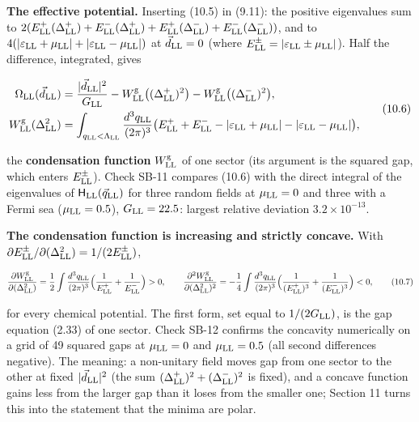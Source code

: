 \documentclass[
  10pt,
]{article}
\begin{document}
\textbf{The effective potential.} Inserting (10.5) in (9.11): the
positive eigenvalues sum to
\(2(E^+_{\rm LL}(\Delta^+_{\rm LL})+E^-_{\rm LL}(\Delta^+_{\rm LL})+E^+_{\rm LL}(\Delta^-_{\rm LL})+E^-_{\rm LL}(\Delta^-_{\rm LL}))\),
and to
\(4(\lvert\varepsilon_{\rm LL}+\mu_{\rm LL}\rvert+\lvert\varepsilon_{\rm LL}-\mu_{\rm LL}\rvert)\)
at \(\vec d_{\rm LL}=0\) (where
\(E^\pm_{\rm LL}=\lvert\varepsilon_{\rm LL}\pm\mu_{\rm LL}\rvert\)).
Half the difference, integrated, gives

\[\begin{aligned}\Omega_{\rm LL}(\vec d_{\rm LL})&=\frac{\lvert\vec d_{\rm LL}\rvert^2}{G_{\rm LL}}-W^{\rm g}_{\rm LL}\big((\Delta^+_{\rm LL})^2\big)-W^{\rm g}_{\rm LL}\big((\Delta^-_{\rm LL})^2\big),\\W^{\rm g}_{\rm LL}(\Delta_{\rm LL}^2)&=\int_{q_{\rm LL}<\Lambda_{\rm LL}}\frac{d^3q_{\rm LL}}{(2\pi)^3}\big(E^+_{\rm LL}+E^-_{\rm LL}-\lvert\varepsilon_{\rm LL}+\mu_{\rm LL}\rvert-\lvert\varepsilon_{\rm LL}-\mu_{\rm LL}\rvert\big),\end{aligned}\tag{10.6}\]

the \textbf{condensation function} \(W^{\rm g}_{\rm LL}\) of one sector
(its argument is the squared gap, which enters \(E^\pm_{\rm LL}\)).
Check SB-11 compares (10.6) with the direct integral of the eigenvalues
of \(\mathsf H_{\rm LL}(\vec q_{\rm LL})\) for three random fields at
\(\mu_{\rm LL}=0\) and three with a Fermi sea (\(\mu_{\rm LL}=0.5\)),
\(G_{\rm LL}=22.5\): largest relative deviation \(3.2\times10^{-13}\).

\textbf{The condensation function is increasing and strictly concave.}
With
\(\partial E^\pm_{\rm LL}/\partial(\Delta_{\rm LL}^2)=1/(2E^\pm_{\rm LL})\),

\[\frac{\partial W^{\rm g}_{\rm LL}}{\partial(\Delta_{\rm LL}^2)}=\frac12\int\frac{d^3q_{\rm LL}}{(2\pi)^3}\Big(\frac1{E^+_{\rm LL}}+\frac1{E^-_{\rm LL}}\Big)>0,\qquad\frac{\partial^2W^{\rm g}_{\rm LL}}{\partial(\Delta_{\rm LL}^2)^2}=-\frac14\int\frac{d^3q_{\rm LL}}{(2\pi)^3}\Big(\frac1{(E^+_{\rm LL})^3}+\frac1{(E^-_{\rm LL})^3}\Big)<0,\tag{10.7}\]

for every chemical potential. The first form, set equal to
\(1/(2G_{\rm LL})\), is the gap equation (2.33) of one sector. Check
SB-12 confirms the concavity numerically on a grid of 49 squared gaps at
\(\mu_{\rm LL}=0\) and \(\mu_{\rm LL}=0.5\) (all second differences
negative). The meaning: a non-unitary field moves gap from one sector to
the other at fixed \(\lvert\vec d_{\rm LL}\rvert^2\) (the sum
\((\Delta^+_{\rm LL})^2+(\Delta^-_{\rm LL})^2\) is fixed), and a concave
function gains less from the larger gap than it loses from the smaller
one; Section 11 turns this into the statement that the minima are polar.
\end{document}
